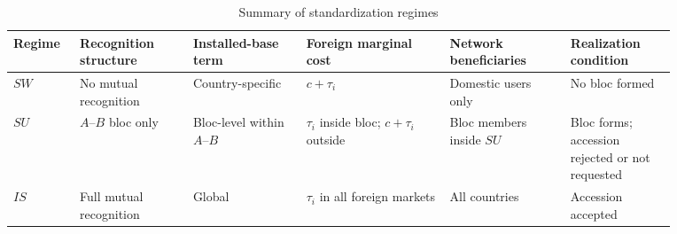 \begin{table}[t]
\centering
\caption{Summary of standardization regimes}
\label{tab:regime_summary}
\scriptsize
\setlength{\tabcolsep}{3pt}
\renewcommand{\arraystretch}{1.05}
\begin{tabular}{@{}p{0.08\linewidth}p{0.15\linewidth}p{0.15\linewidth}p{0.19\linewidth}p{0.16\linewidth}p{0.14\linewidth}@{}}
\toprule
Regime & Recognition structure & Installed-base term & Foreign marginal cost & Network beneficiaries & Realization condition \\
\midrule
$SW$ & No mutual recognition & Country-specific & $c+\tau_i$ & Domestic users only & No bloc formed \\
$SU$ & $A$--$B$ bloc only & Bloc-level within $A$--$B$ & $\tau_i$ inside bloc; $c+\tau_i$ outside & Bloc members inside $SU$ & Bloc forms; accession rejected or not requested \\
$IS$ & Full mutual recognition & Global & $\tau_i$ in all foreign markets & All countries & Accession accepted \\
\bottomrule
\end{tabular}
\end{table}
